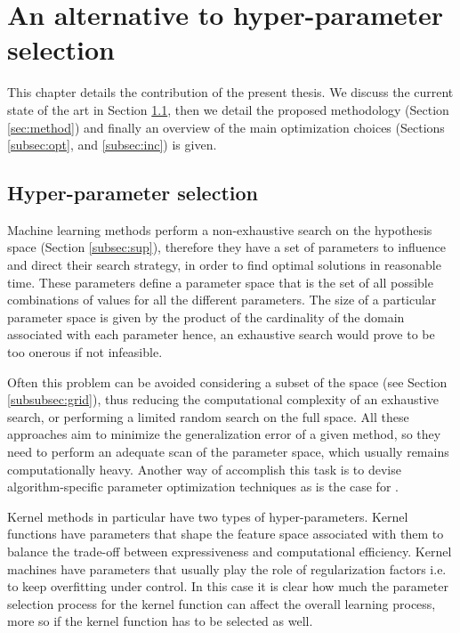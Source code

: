 \chapter{An alternative to hyper-parameter selection}
\label{Chapter3}

This chapter details the contribution of the present thesis.
We discuss the current state of the art in Section \ref{sec:hyper}, then we detail
the proposed methodology (Section \ref{sec:method}) and finally an overview
of the main optimization choices (Sections \ref{subsec:opt}, and \ref{subsec:inc}) is
given.

\section{Hyper-parameter selection}
\label{sec:hyper}
Machine learning methods perform a non-exhaustive search on the hypothesis space
(Section \ref{subsec:sup}), therefore they have a set of parameters to influence
and direct their search strategy, in order to find optimal solutions in reasonable time.
These parameters define a parameter space that is the set of all possible combinations of
values for all the different parameters.
The size of a particular parameter space is given by the product of the cardinality
of the domain associated with each parameter hence, an exhaustive search would
prove to be too onerous if not infeasible.


Often this problem can be avoided considering a subset of the space (see Section
\ref{subsubsec:grid}), thus reducing the computational complexity of an exhaustive
search, or performing a limited random search on the full space.
All these approaches aim to minimize the generalization error of a given method,
so they need to perform an adequate scan of the parameter space, which usually
remains computationally heavy.
Another way of accomplish this task is to devise algorithm-specific parameter
optimization techniques as is the case for \cite{chappelle}.

Kernel methods in particular have two types of hyper-parameters.
Kernel functions have parameters that shape the feature space associated with them
to balance the trade-off between expressiveness and computational efficiency.
Kernel machines have parameters that usually play the role of regularization
factors i.e. to keep overfitting under control.
In this case it is clear how much the parameter selection process for the kernel function
can affect the overall learning process, more so if the kernel function has to be
selected as well.

